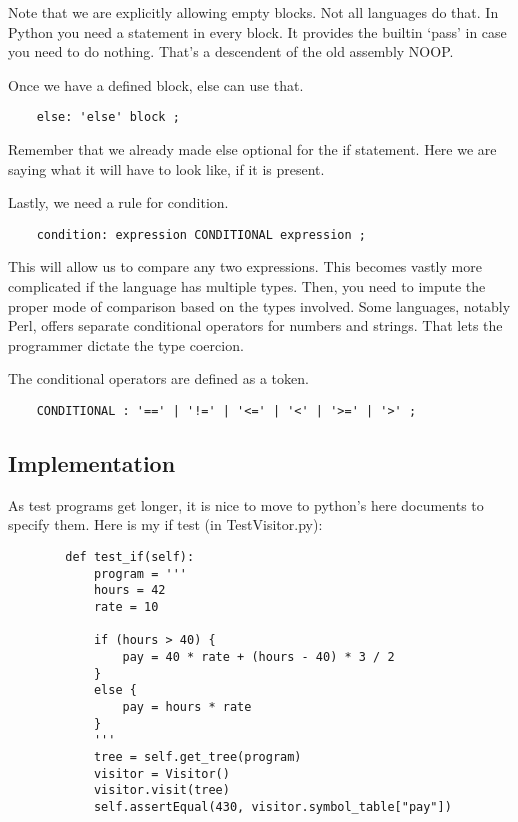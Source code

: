 Note that we are explicitly allowing empty blocks. Not all languages
do that. In Python you need a statement in every block. It provides
the builtin `pass' in case you need to do nothing. That's a descendent
of the old assembly NOOP.

Once we have a defined block, else can use that.

{\footnotesize
\begin{verbatim}
    else: 'else' block ;
\end{verbatim}
}

Remember that we already made else optional for the if statement.
Here we are saying what it will have to look like, if it is present.

Lastly, we need a rule for condition.

{\footnotesize
\begin{verbatim}
    condition: expression CONDITIONAL expression ;
\end{verbatim}
}

This will allow us to compare any two expressions. This becomes vastly
more complicated if the language has multiple types. Then, you need
to impute the proper mode of comparison based on the types involved.
Some languages, notably Perl, offers separate conditional operators
for numbers and strings. That lets the programmer dictate the type coercion.

The conditional operators are defined as a token.

{\footnotesize
\begin{verbatim}
    CONDITIONAL : '==' | '!=' | '<=' | '<' | '>=' | '>' ;
\end{verbatim}
}

\subsection{Implementation}

As test programs get longer, it is nice to move to python's here documents
to specify them. Here is my if test (in TestVisitor.py):

{\footnotesize
\begin{verbatim}
        def test_if(self):
            program = '''
            hours = 42
            rate = 10

            if (hours > 40) {
                pay = 40 * rate + (hours - 40) * 3 / 2
            }
            else {
                pay = hours * rate
            }
            '''
            tree = self.get_tree(program)
            visitor = Visitor()
            visitor.visit(tree)
            self.assertEqual(430, visitor.symbol_table["pay"])
\end{verbatim}
}

